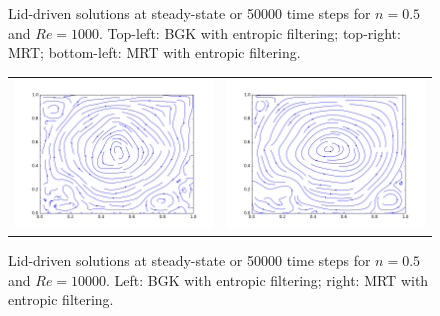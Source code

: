 \begin{figure}
\begin{tabulary}{\linewidth}{c c}
	\end{tabulary}
	\caption{Lid-driven solutions at steady-state or 50000 time steps for $n = 0.5$ and $Re = 1000$. Top-left: BGK with entropic filtering; top-right: MRT; bottom-left: MRT with entropic filtering.}
	\label{fig:lid-n05-Re1000}
\end{figure}

\begin{figure}
	\centering
	\begin{tabulary}{\linewidth}{c c}
		\includegraphics[width=\figwid]{figs/lid/power_bgk-filter_100_n0.5_Re10000/sl_step-000050000}
		&
		\includegraphics[width=\figwid]{figs/lid/power_mrt-filter_100_n0.5_Re10000/sl_step-000050000}
	\end{tabulary}
	\caption{Lid-driven solutions at steady-state or 50000 time steps for $n = 0.5$ and $Re = 10000$. Left: BGK with entropic filtering; right: MRT with entropic filtering.}
	\label{fig:lid-n05-Re10000}
\end{figure}

